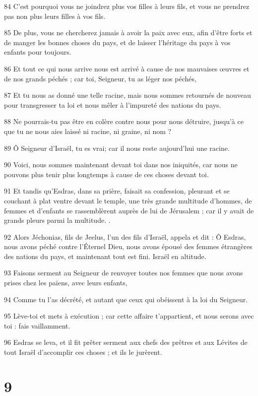 \par 84 C'est pourquoi vous ne joindrez plus vos filles à leurs fils, et vous ne prendrez pas non plus leurs filles à vos fils.
\par 85 De plus, vous ne chercherez jamais à avoir la paix avec eux, afin d'être forts et de manger les bonnes choses du pays, et de laisser l'héritage du pays à vos enfants pour toujours.
\par 86 Et tout ce qui nous arrive nous est arrivé à cause de nos mauvaises œuvres et de nos grands péchés ; car toi, Seigneur, tu as léger nos péchés,
\par 87 Et tu nous as donné une telle racine, mais nous sommes retournés de nouveau pour transgresser ta loi et nous mêler à l'impureté des nations du pays.
\par 88 Ne pourrais-tu pas être en colère contre nous pour nous détruire, jusqu'à ce que tu ne nous aies laissé ni racine, ni graine, ni nom ?
\par 89 Ô Seigneur d'Israël, tu es vrai; car il nous reste aujourd'hui une racine.
\par 90 Voici, nous sommes maintenant devant toi dans nos iniquités, car nous ne pouvons plus tenir plus longtemps à cause de ces choses devant toi.
\par 91 Et tandis qu'Esdras, dans sa prière, faisait sa confession, pleurant et se couchant à plat ventre devant le temple, une très grande multitude d'hommes, de femmes et d'enfants se rassemblèrent auprès de lui de Jérusalem ; car il y avait de grands pleurs parmi la multitude. .
\par 92 Alors Jéchonias, fils de Jeelus, l'un des fils d'Israël, appela et dit : Ô Esdras, nous avons péché contre l'Éternel Dieu, nous avons épousé des femmes étrangères des nations du pays, et maintenant tout est fini. Israël en altitude.
\par 93 Faisons serment au Seigneur de renvoyer toutes nos femmes que nous avons prises chez les païens, avec leurs enfants,
\par 94 Comme tu l'as décrété, et autant que ceux qui obéissent à la loi du Seigneur.
\par 95 Lève-toi et mets à exécution ; car cette affaire t'appartient, et nous serons avec toi : fais vaillamment.
\par 96 Esdras se leva, et il fit prêter serment aux chefs des prêtres et aux Lévites de tout Israël d'accomplir ces choses ; et ils le jurèrent.

\chapter{9}

